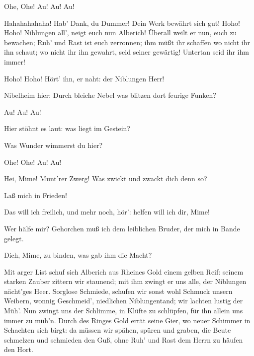 \begin{drama}
Ohe, Ohe! Au! Au! Au!
 

\Alberichspeaks


Hahahahahaha!
Hab' Dank, du Dummer!
Dein Werk bewährt sich gut!
Hoho! Hoho!
Niblungen all', neigt euch nun Alberich!
Überall weilt er nun, euch zu bewachen;
Ruh' und Rast ist euch zerronnen;
ihm müßt ihr schaffen wo nicht ihr ihn schaut;
wo nicht ihr ihn gewahrt, seid seiner gewärtig!
Untertan seid ihr ihm immer!
 



Hoho! Hoho! Hört' ihn, er naht:
der Niblungen Herr!
 




\Logespeaks
Nibelheim hier:
Durch bleiche Nebel
was blitzen dort feurige Funken?
 

\Mimespeaks
Au! Au! Au!
 

\Wotanspeaks
Hier stöhnt es laut:
was liegt im Gestein?
 

\Logespeaks


Was Wunder wimmerst du hier?
 

\Mimespeaks
Ohe! Ohe! Au! Au!
 

\Logespeaks
Hei, Mime! Munt'rer Zwerg!
Was zwickt und zwackt dich denn so?
 

\Mimespeaks
Laß mich in Frieden!
 

\Logespeaks
Das will ich freilich,
und mehr noch, hör':
helfen will ich dir, Mime!
 




\Mimespeaks
Wer hälfe mir?
Gehorchen muß ich dem leiblichen Bruder,
der mich in Bande gelegt.
 

\Logespeaks
Dich, Mime, zu binden,
was gab ihm die Macht?
 

\Mimespeaks
Mit arger List schuf sich Alberich
aus Rheines Gold einem gelben Reif:
seinem starken Zauber zittern wir staunend;
mit ihm zwingt er uns alle,
der Niblungen nächt'ges Heer.
Sorglose Schmiede, schufen wir sonst wohl
Schmuck unsern Weibern, wonnig Geschmeid',
niedlichen Niblungentand;
wir lachten lustig der Müh'.
Nun zwingt uns der Schlimme,
in Klüfte zu schlüpfen,
für ihn allein uns immer zu müh'n.
Durch des Ringes Gold errät seine Gier,
wo neuer Schimmer in Schachten sich birgt:
da müssen wir spähen, spüren und graben,
die Beute schmelzen und schmieden den Guß,
ohne Ruh' und Rast
dem Herrn zu häufen den Hort.
 


\end{drama}
